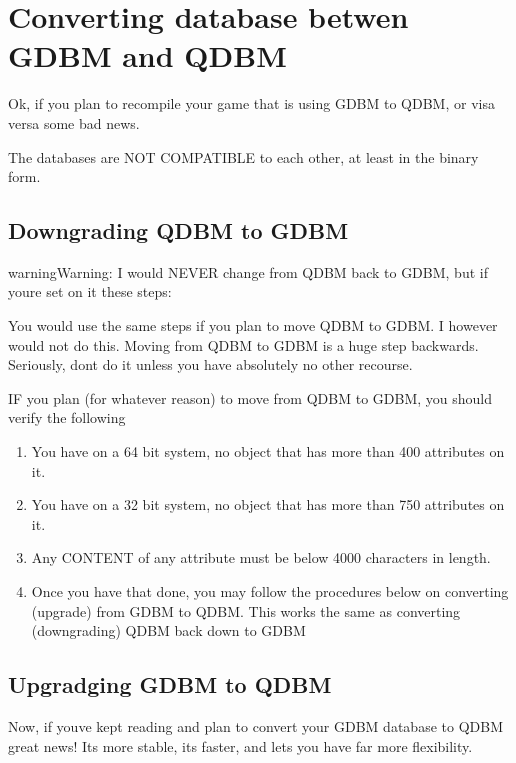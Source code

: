\documentclass[letterpaper,10pt,english]{sphinxmanual}
\begin{document}
\section{Converting database betwen GDBM and QDBM}
\label{\detokenize{legacy:converting-database-betwen-gdbm-and-qdbm}}
\sphinxAtStartPar
Ok, if you plan to recompile your game that is using GDBM to QDBM, or visa versa
some bad news.

\sphinxAtStartPar
The databases are NOT COMPATIBLE to each other, at least in the binary form.


\subsection{Downgrading QDBM to GDBM}
\label{\detokenize{legacy:downgrading-qdbm-to-gdbm}}
\begin{sphinxadmonition}{warning}{Warning:}
\sphinxAtStartPar
I would NEVER change from QDBM back to GDBM, but if you\textquotesingle{}re set on it these steps:

\sphinxAtStartPar
You would use the same steps if you plan to move QDBM to GDBM.  I however would
not do this.  Moving from QDBM to GDBM is a huge step backwards.  Seriously,
don\textquotesingle{}t do it unless you have absolutely no other recourse.

\sphinxAtStartPar
IF you plan (for whatever reason) to move from QDBM to GDBM, you should verify
the following
\end{sphinxadmonition}
\begin{enumerate}
%
\item {} 
\sphinxAtStartPar
You have on a 64 bit system, no object that has more than 400 attributes on it.

\item {} 
\sphinxAtStartPar
You have on a 32 bit system, no object that has more than 750 attributes on it.

\item {} 
\sphinxAtStartPar
Any CONTENT of any attribute must be below 4000 characters in length.

\item {} 
\sphinxAtStartPar
Once you have that done, you may follow the procedures below on converting (upgrade) from GDBM to QDBM.  This works the same as converting (downgrading) QDBM back down to GDBM

\end{enumerate}


\subsection{Upgradging GDBM to QDBM}
\label{\detokenize{legacy:upgradging-gdbm-to-qdbm}}
\sphinxAtStartPar
Now, if you\textquotesingle{}ve kept reading and plan to convert your GDBM database to QDBM great news!
It\textquotesingle{}s more stable, it\textquotesingle{}s faster, and lets you have far more flexibility.
\end{document}
